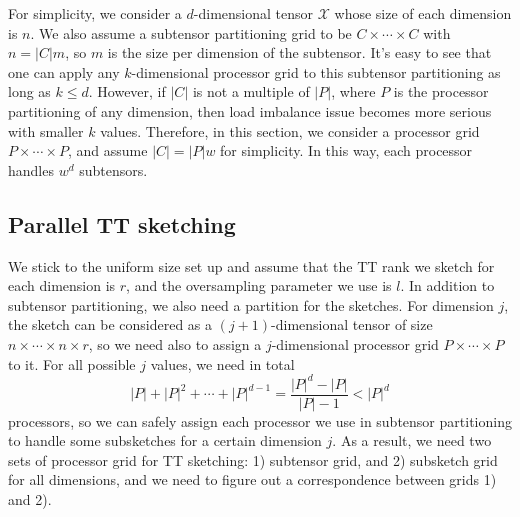 \documentclass[11pt,a4paper,review]{siamart220329}
\begin{document}
For simplicity, we consider a $d$-dimensional tensor $\mathcal{X}$ whose size of each dimension is $n$. We also assume a subtensor partitioning grid to be $C \times \cdots \times C$ with $n = |C|m$, so $m$ is the size per dimension of the subtensor. It's easy to see that one can apply any $k$-dimensional processor grid to this subtensor partitioning as long as $k \le d$. However, if $|C|$ is not a multiple of $|P|$, where $P$ is the processor partitioning of any dimension, then load imbalance issue becomes more serious with smaller $k$ values. Therefore, in this section, we consider a processor grid $P \times \cdots \times P$, and assume $|C|=|P|w$ for simplicity. In this way, each processor handles $w^d$ subtensors.

\subsection{Parallel TT sketching}
We stick to the uniform size set up and assume that the TT rank we sketch for each dimension is $r$, and the oversampling parameter we use is $l$. In addition to subtensor partitioning, we also need a partition for the sketches. For dimension $j$, the sketch can be considered as a $(j+1)$-dimensional tensor of size $n \times \cdots \times n \times r$, so we need also to assign a $j$-dimensional processor grid $P \times \cdots \times P$ to it. For all possible $j$ values, we need in total
\[ |P|+|P|^2+\cdots+|P|^{d-1} = \frac{|P|^d-|P|}{|P|-1} < |P|^d \]
processors, so we can safely assign each processor we use in subtensor partitioning to handle some subsketches for a certain dimension $j$. As a result, we need two sets of processor grid for TT sketching: 1) subtensor grid, and 2) subsketch grid for all dimensions, and we need to figure out a correspondence between grids 1) and 2).
\end{document}
